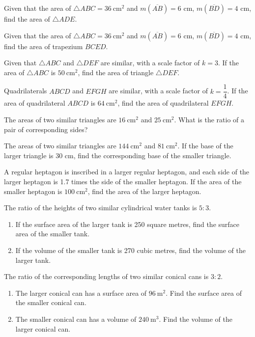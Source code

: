 \documentclass[11pt]{article}
\newcommand{\seg}[1]{\overline{#1}}
\begin{document}
\begin{wq}[start=287]
\item Given that the area of $\triangle ABC = 36\ \text{cm}^2$ and $m(\seg{AB})=6$ cm, $m(\seg{BD})=4$ cm, find the area of $\triangle ADE$.

\item Given that the area of $\triangle ABC = 36\ \text{cm}^2$ and $m(\seg{AB})=6$ cm, $m(\seg{BD})=4$ cm, find the area of trapezium $BCED$.

\item Given that $\triangle ABC$ and $\triangle DEF$ are similar, with a scale factor of $k=3$. If the area of $\triangle ABC$ is $50\ \text{cm}^2$, find the area of triangle $\triangle DEF$.

\item Quadrilaterals $ABCD$ and $EFGH$ are similar, with a scale factor of $k=\dfrac{1}{4}$. If the area of quadrilateral $ABCD$ is $64\ \text{cm}^2$, find the area of quadrilateral $EFGH$.

\item The areas of two similar triangles are $16\ \text{cm}^2$ and $25\ \text{cm}^2$. What is the ratio of a pair of corresponding sides?

\item The areas of two similar triangles are $144\ \text{cm}^2$ and $81\ \text{cm}^2$. If the base of the larger triangle is 30 cm, find the corresponding base of the smaller triangle.

\item A regular heptagon is inscribed in a larger regular heptagon, and each side of the larger heptagon is 1.7 times the side of the smaller heptagon. If the area of the smaller heptagon is $100\ \text{cm}^2$, find the area of the larger heptagon.

\item The ratio of the heights of two similar cylindrical water tanks is $5:3$.
\begin{enumerate}[label=(\arabic*)]
\item If the surface area of the larger tank is 250 square metres, find the surface area of the smaller tank.
\item If the volume of the smaller tank is 270 cubic metres, find the volume of the larger tank.
\end{enumerate}

\item The ratio of the corresponding lengths of two similar conical cans is $3:2$.
\begin{enumerate}[label=(\roman*)]
\item The larger conical can has a surface area of $96\ \text{m}^2$. Find the surface area of the smaller conical can.
\item The smaller conical can has a volume of $240\ \text{m}^3$. Find the volume of the larger conical can.
\end{enumerate}


\end{wq}
\end{document}
